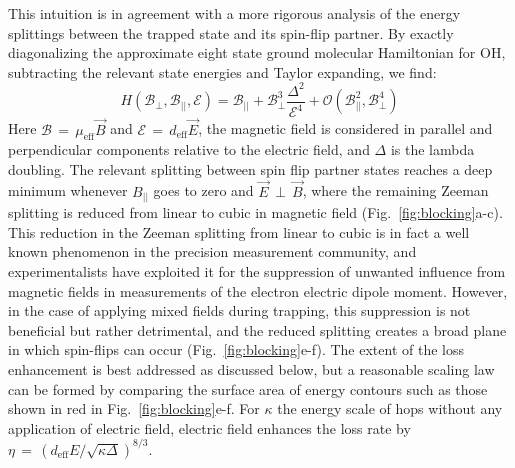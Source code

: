 \documentclass[%
 reprint,
 amsmath,amssymb,
 aps,
prl,
]{revtex4-1}
\newcommand{\epb}{{$\vec{E}\,{\perp}\,\vec{B}$}}
\begin{document}
This intuition is in agreement with a more rigorous analysis of the energy splittings between the trapped state and its spin-flip partner. 
By exactly diagonalizing the approximate eight state ground molecular Hamiltonian for OH, subtracting the relevant state energies and Taylor expanding, we find:
\begin{equation}
H(\mathcal{B}_\perp,\mathcal{B}_{||},\mathcal{E}) = \mathcal{B}_{||} + \mathcal{B}_\perp^3\frac{\Delta^2}{\mathcal{E}^4} + \mathcal{O}(\mathcal{B}_{||}^2,\mathcal{B}_\perp^4)
\end{equation}
Here $\mathcal{B}\,{=}\,\mu_\text{eff}\vec{B}$ and $\mathcal{E}\,{=}\,d_\text{eff}\vec{E}$, the magnetic field is considered in parallel and perpendicular components relative to the electric field, and $\Delta$ is the lambda doubling.
The relevant splitting between spin flip partner states reaches a deep minimum whenever $B_{||}$ goes to zero and \epb, where the remaining Zeeman splitting is reduced from linear to cubic in magnetic field (Fig.~\ref{fig:blocking}a-c).
This reduction in the Zeeman splitting from linear to cubic is in fact a well known phenomenon in the precision measurement community\cite{Player1970,Hudson2002}, and experimentalists have exploited it for the suppression of unwanted influence from magnetic fields in measurements of the electron electric dipole moment.
However, in the case of applying mixed fields during trapping, this suppression is not beneficial but rather detrimental, and the reduced splitting creates a broad plane in which spin-flips can occur (Fig.~\ref{fig:blocking}e-f).
The extent of the loss enhancement is best addressed as discussed below, but a reasonable scaling law can be formed by comparing the surface area of energy contours such as those shown in red in Fig.~\ref{fig:blocking}e-f.
For $\kappa$ the energy scale of hops without any application of electric field, electric field enhances the loss rate by $\eta \,{=}\, (d_\text{eff}E/\sqrt{\kappa\Delta})^{8/3}$.
\end{document}
